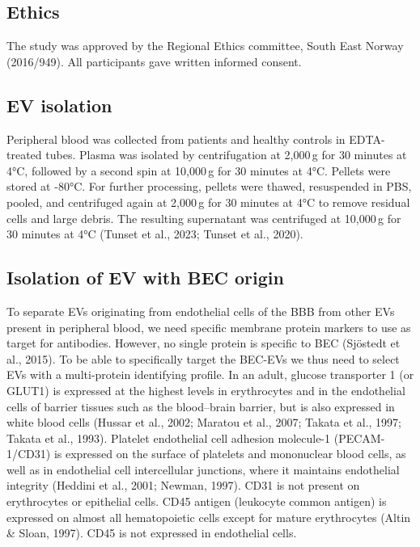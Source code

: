 \documentclass[authordate, empirical]{jote-new-article}
\begin{document}
	\subsection{Ethics}



	The study was approved by the Regional Ethics committee, South East Norway (2016/949). All participants gave written informed consent.







	\subsection{EV isolation}



	Peripheral blood was collected from patients and healthy controls in EDTA-treated tubes. Plasma was isolated by centrifugation at 2,000 g for 30 minutes at 4°C, followed by a second spin at 10,000 g for 30 minutes at 4°C. Pellets were stored at -80°C. For further processing, pellets were thawed, resuspended in PBS, pooled, and centrifuged again at 2,000 g for 30 minutes at 4°C to remove residual cells and large debris. The resulting supernatant was centrifuged at 10,000 g for 30 minutes at 4°C (Tunset et al., 2023; Tunset et al., 2020).







	\subsection{Isolation of EV with BEC origin }



	To separate EVs originating from endothelial cells of the BBB from other EVs present in peripheral blood, we need specific membrane protein markers to use as target for antibodies. However, no single protein is specific to BEC (Sjöstedt et al., 2015). To be able to specifically target the BEC-EVs we thus need to select EVs with a multi-protein identifying profile. In an adult, glucose transporter 1 (or GLUT1) is expressed at the highest levels in erythrocytes and in the endothelial cells of barrier tissues such as the blood--brain barrier, but is also expressed in white blood cells (Hussar et al., 2002; Maratou et al., 2007; Takata et al., 1997; Takata et al., 1993). Platelet endothelial cell adhesion molecule-1 (PECAM-1/CD31) is expressed on the surface of platelets and mononuclear blood cells, as well as in endothelial cell intercellular junctions, where it maintains endothelial integrity (Heddini et al., 2001; Newman, 1997). CD31 is not present on erythrocytes or epithelial cells. CD45 antigen (leukocyte common antigen) is expressed on almost all hematopoietic cells except for mature erythrocytes (Altin \& Sloan, 1997). CD45 is not expressed in endothelial cells.
\end{document}
